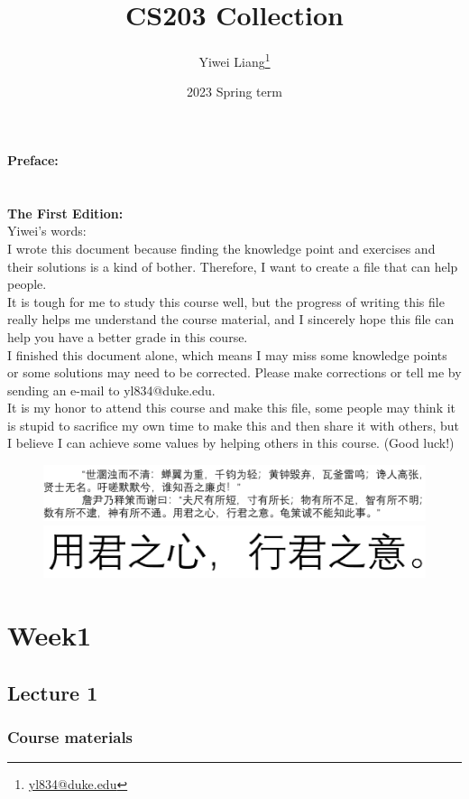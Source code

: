 \documentclass{article}
\title{CS203 Collection}
\author{Yiwei Liang\thanks{\href{mailto:yl834@duke.edu}{yl834@duke.edu}}}
\date{2023 Spring term}
\begin{document}
\maketitle
\newpage
\textbf{Preface:}\\
\\
\\
\textbf{The First Edition:}\\
Yiwei's words:\\
I wrote this document because finding the knowledge point and exercises and their solutions is a kind of bother. Therefore, I want to create a file that can help people.\\
It is tough for me to study this course well, but the progress of writing this file really helps me understand the course material, and I sincerely hope this file can help you have a better grade in this course.\\
I finished this document alone, which means I may miss some knowledge points or some solutions may need to be corrected. Please make corrections or tell me by sending an e-mail to yl834@duke.edu.\\
It is my honor to attend this course and make this file, some people may think it is stupid to sacrifice my own time to make this and then share it with others, but I believe I can achieve some values by helping others in this course. (Good luck!)\\
\begin{figure}[H]
    \centering
    \includegraphics{preface_e1}
    \\
    \includegraphics{preface_e1_1}
\end{figure}
\newpage
\tableofcontents
\newpage \section{Week1}
\subsection{Lecture 1}
\subsubsection{Course materials}
\end{document}
